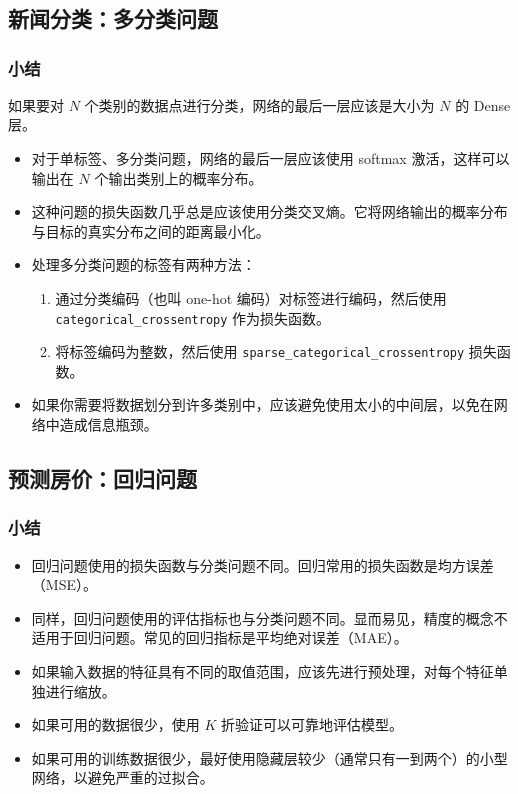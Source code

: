 \chapter{\label{Ch04}}
\section{新闻分类：多分类问题}
\subsection{小结}
如果要对 $N$ 个类别的数据点进行分类，网络的最后一层应该是大小为 $N$ 的 Dense 层。
\begin{itemize}
    \item 对于单标签、多分类问题，网络的最后一层应该使用 softmax 激活，这样可以输出在 $N$ 个输出类别上的概率分布。
    \item  这种问题的损失函数几乎总是应该使用分类交叉熵。它将网络输出的概率分布与目标的真实分布之间的距离最小化。
    \item  处理多分类问题的标签有两种方法：
          \begin{enumerate}
              \item  通过分类编码（也叫 one-hot 编码）对标签进行编码，然后使用 \verb|categorical_crossentropy| 作为损失函数。
              \item  将标签编码为整数，然后使用 \verb|sparse_categorical_crossentropy| 损失函数。
          \end{enumerate}
    \item 如果你需要将数据划分到许多类别中，应该避免使用太小的中间层，以免在网络中造成信息瓶颈。
\end{itemize}

\section{预测房价：回归问题}
\subsection{小结}
\begin{itemize}
    \item 回归问题使用的损失函数与分类问题不同。回归常用的损失函数是均方误差（MSE）。
    \item 同样，回归问题使用的评估指标也与分类问题不同。显而易见，精度的概念不适用于回归问题。常见的回归指标是平均绝对误差（MAE）。
    \item 如果输入数据的特征具有不同的取值范围，应该先进行预处理，对每个特征单独进行缩放。
    \item 如果可用的数据很少，使用 $K$ 折验证可以可靠地评估模型。
    \item 如果可用的训练数据很少，最好使用隐藏层较少（通常只有一到两个）的小型网络，以避免严重的过拟合。
\end{itemize}